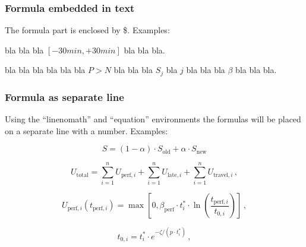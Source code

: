 \subsubsection{Formula embedded in text}

The formula part is enclosed by \$. Examples:

bla bla bla $[-30min,+30min]$ bla bla bla.

bla bla bla bla bla bla $P > N$ bla bla bla $S_{j}$ bla $j$ bla bla
bla  $\beta$ bla bla bla.

\subsubsection{Formula as separate line}

Using the ``linenomath'' and ``equation'' environments the formulas will be placed on a
separate line with a number. Examples:

\begin{linenomath}   
\begin{equation}
  \label{eq:score-averaging}
  S = (1 - \alpha) \cdot S_\text{old} + \alpha \cdot S_\text{new} 
  \end{equation}
\end{linenomath}

\begin{linenomath}   
  \begin{equation}
  \label{eq:utility-total}
  U_\text{total} = \sum_{i=1}^{n} U_{\text{perf},i} + \sum_{i=1}^{n} U_{\text{late},i}
              + \sum_{i=1}^{n} U_{\text{travel},i}\,,
   \end{equation} 
\end{linenomath}

\begin{linenomath}   
    \begin{equation}   
    \label{eq:utility-perform}
  U_{\text{perf},i}(t_{\text{perf},i}) = \max \left[ 0 , \beta_{\text{perf}} \cdot
t^{*}_{i} \cdot
                \ln \left( \frac{t_{\text{perf},i}}{t_{0,i}} \right)
\right]\,,
   \end{equation} 
\end{linenomath}

\begin{linenomath}   
    \begin{equation}   
    \label{eq:typical-duration}
  t_{0,i} = t^{*}_{i} \cdot e^{-\zeta / (p \cdot t^{*}_i)}\,,
   \end{equation} 
\end{linenomath}

